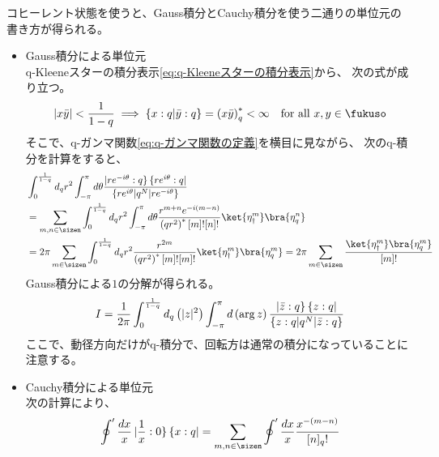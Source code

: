 {	コヒーレント状態を使うと、Gauss積分とCauchy積分を使う二通りの単位元の
	書き方が得られる。

	\begin{itemize}\setlength{\itemsep}{-1mm} %
		\item Gauss積分による単位元 \\
		q-Kleeneスターの積分表示\eqref{eq:q-Kleeneスターの積分表示}から、
		次の式が成り立つ。
		\begin{equation*}\begin{split}
			|x\bar{y}| < \frac{1}{1 - q} 
			\implies \cbraket{x:q|\bar{y}:q} = \lr{x\bar{y}}_q^* < \infty
			\quad\text{for all } x,y\in\fukuso
		\end{split}\end{equation*}
		そこで、q-ガンマ関数\eqref{eq:q-ガンマ関数の定義}を横目に見ながら、
		次のq-積分を計算をすると、
		\begin{equation*}\begin{split}
			& \int_0^{\frac{1}{1 - q}} d_qr^2 \int_{-\pi}^{\pi} d\theta
				\frac{\cket{re^{-i\theta}:q}\cbra{re^{i\theta}:q}}
				{\cbraket{re^{i\theta}|q^N|re^{-i\theta}}} \\
			&= \sum_{m,n\in\sizen}\int_0^{\frac{1}{1 - q}} d_qr^2 
				\int_{-\pi}^{\pi} d\theta
				\frac{r^{m+n}e^{-i\lr{m-n}}}{\lr{qr^2}^*[m]![n]!}
				\ket{\eta_\dag^m}\bra{\eta_q^n} \\
			&= 2\pi \sum_{m\in\sizen}\int_0^{\frac{1}{1 - q}} d_qr^2 
				\frac{r^{2m}}{\lr{qr^2}^*[m]![m]!}
				\ket{\eta_\dag^m}\bra{\eta_q^m}
			= 2\pi \sum_{m\in\sizen} \frac{\ket{\eta_\dag^m}\bra{\eta_q^m}}{[m]!}
		\end{split}\end{equation*}
		Gauss積分による$1$の分解が得られる。
		\begin{equation*}\begin{split}
			I = \frac{1}{2\pi}\int_0^{\frac{1}{1 - q}} d_q\left({|z|^2}\right)
				\int_{-\pi}^{\pi} d\left({\arg z}\right)
				\frac{\mathinner{|{\bar{z}:q}\}}\mathinner{\{{z:q}|}}{\mathinner{\{{z:q|q^N|\bar{z}:q}\}}}
		\end{split}\end{equation*}
		ここで、動径方向だけがq-積分で、回転方は通常の積分になっていることに
		注意する。
		\item Cauchy積分による単位元 \\
		次の計算により、
		\begin{equation*}\begin{split}
			\oint'\frac{dx}{x}\cket{\frac{1}{x}:0}\cbra{x:q}
			= \sum_{m,n\in\sizen}\oint'\frac{dx}{x} \frac{x^{-\lr{m-n}}}{[n]_q!}

\end{split}
\end{equation*}
\end{itemize}}
